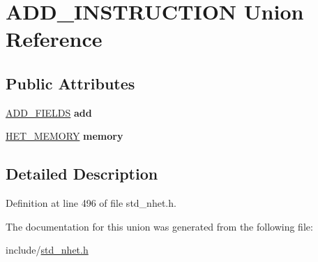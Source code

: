 \hypertarget{unionADD__INSTRUCTION}{}\section{A\+D\+D\+\_\+\+I\+N\+S\+T\+R\+U\+C\+T\+I\+ON Union Reference}
\label{unionADD__INSTRUCTION}
\subsection*{Public Attributes}
\begin{DoxyCompactItemize}
\item 
\mbox{\label{unionADD__INSTRUCTION_afc6170422cf972dab669caaa5cb327a6}} 
\mbox{\hyperlink{structADD__format}{A\+D\+D\+\_\+\+F\+I\+E\+L\+DS}} {\bfseries add}
\item 
\mbox{\label{unionADD__INSTRUCTION_a9230c9b828e5411921ceef782059f679}} 
\mbox{\hyperlink{structmemory__format}{H\+E\+T\+\_\+\+M\+E\+M\+O\+RY}} {\bfseries memory}
\end{DoxyCompactItemize}


\subsection{Detailed Description}


Definition at line 496 of file std\+\_\+nhet.\+h.



The documentation for this union was generated from the following file\+:\begin{DoxyCompactItemize}
\item 
include/\mbox{\hyperlink{std__nhet_8h}{std\+\_\+nhet.\+h}}\end{DoxyCompactItemize}
